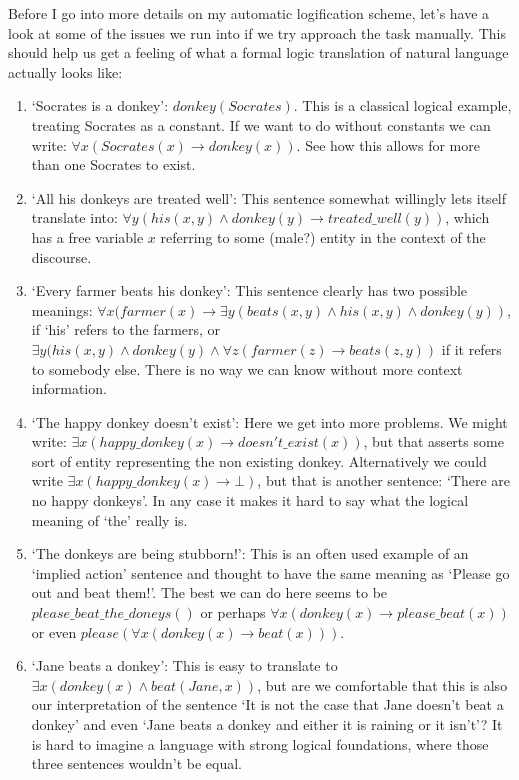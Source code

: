 \documentclass[12pt]{article}
\begin{document}
Before I go into more details on my automatic logification scheme, let's have a look at some of the issues we run into if we try approach the task manually. This should help us get a feeling of what a formal logic translation of natural language actually looks like:
\begin{enumerate}

\item `Socrates is a donkey': $donkey(Socrates)$. This is a classical logical example, treating Socrates as a constant. If we want to do without constants we can write: $\forall x(Socrates(x)\rightarrow donkey(x))$. See how this allows for more than one Socrates to exist.

\item `All his donkeys are treated well': This sentence somewhat willingly lets itself translate into: $\forall y(his(x,y)\wedge donkey(y) \rightarrow treated\_well(y))$, which has a free variable $x$ referring to some (male?) entity in the context of the discourse.

\item `Every farmer beats his donkey': This sentence clearly has two possible meanings: $\forall x(farmer(x)\rightarrow \exists y (beats(x,y)\wedge his(x,y)\wedge donkey(y))$, if `his' refers to the farmers, or $\exists y(his(x,y)\wedge donkey(y)\wedge \forall z(farmer(z) \rightarrow beats(z,y))$ if it refers to somebody else. There is no way we can know without more context information.

\item `The happy donkey doesn't exist': Here we get into more problems. We might write: $\exists x(happy\_donkey(x)\rightarrow doesn't\_exist(x))$, but that asserts some sort of entity representing the non existing donkey. Alternatively we could write $\exists x(happy\_donkey(x)\rightarrow \bot)$, but that is another sentence: `There are no happy donkeys'. In any case it makes it hard to say what the logical meaning of `the' really is.

\item `The donkeys are being stubborn!': This is an often used example of an `implied action' sentence and thought to have the same meaning as `Please go out and beat them!'. The best we can do here seems to be $please\_beat\_the\_doneys()$ or perhaps $\forall x(donkey(x)\rightarrow please\_beat(x))$ or even $please(\forall x(donkey(x)\rightarrow beat(x)))$.

\item `Jane beats a donkey': This is easy to translate to $\exists x(donkey(x)\wedge beat(Jane,x))$, but are we comfortable that this is also our interpretation of the sentence `It is not the case that Jane doesn't beat a donkey' and even `Jane beats a donkey and either it is raining or it isn't'? It is hard to imagine a language with strong logical foundations, where those three sentences wouldn't be equal.
\end{enumerate}
\end{document}
